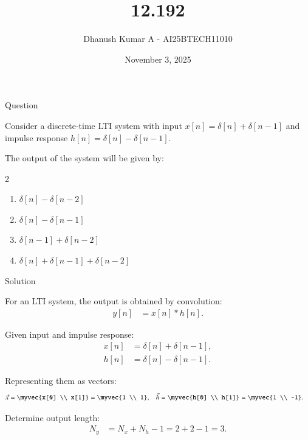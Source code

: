 \documentclass{beamer}
\title 
{12.192}
\date{November 3, 2025}
\author 
{Dhanush Kumar A - AI25BTECH11010}
\begin{document}
\frame{\titlepage}
\begin{frame}{Question}


Consider a discrete-time LTI system with input  
$x[n] = \delta[n] + \delta[n - 1]$  
and impulse response  
$h[n] = \delta[n] - \delta[n - 1]$.  

The output of the system will be given by:
\begin{multicols}{2}

\begin{enumerate}
    \item[(a)] $\delta[n] - \delta[n - 2]$
    \item[(b)] $\delta[n] - \delta[n - 1]$
    \item[(c)] $\delta[n - 1] + \delta[n - 2]$
    \item[(d)] $\delta[n] + \delta[n - 1] + \delta[n - 2]$
\end{enumerate}
\end{multicols}
\end{frame}
\begin{frame}{Solution}


For an LTI system, the output is obtained by convolution:
\begin{align}
y[n] &= x[n] * h[n].
\end{align}

Given input and impulse response:
\begin{align}
x[n] &= \delta[n] + \delta[n-1], \\
h[n] &= \delta[n] - \delta[n-1].
\end{align}

Representing them as vectors:
\begin{align}
\vec{x} &= 
\myvec{x[0] \\ x[1]}
= 
\myvec{1 \\ 1}, &
\vec{h} &= 
\myvec{h[0] \\ h[1]}
= 
\myvec{1 \\ -1}.
\end{align}

Determine output length:
\begin{align}
N_y &= N_x + N_h - 1 = 2 + 2 - 1 = 3.
\end{align}
\end{frame}
\end{document}
